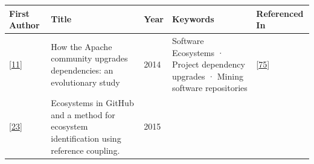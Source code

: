 \documentclass[]{book}
\begin{document}
\begin{longtable}[]{@{}lllll@{}}
\toprule
\begin{minipage}[b]{0.12\columnwidth}\raggedright\strut
First Author\strut
\end{minipage} & \begin{minipage}[b]{0.31\columnwidth}\raggedright\strut
Title\strut
\end{minipage} & \begin{minipage}[b]{0.02\columnwidth}\raggedright\strut
Year\strut
\end{minipage} & \begin{minipage}[b]{0.24\columnwidth}\raggedright\strut
Keywords\strut
\end{minipage} & \begin{minipage}[b]{0.16\columnwidth}\raggedright\strut
Referenced In\strut
\end{minipage}\tabularnewline
\midrule
\endhead
\begin{minipage}[t]{0.12\columnwidth}\raggedright\strut
{[}\protect\hyperlink{ref-Bavota2014}{11}{]}\strut
\end{minipage} & \begin{minipage}[t]{0.31\columnwidth}\raggedright\strut
How the Apache community upgrades dependencies: an evolutionary
study\strut
\end{minipage} & \begin{minipage}[t]{0.02\columnwidth}\raggedright\strut
2014\strut
\end{minipage} & \begin{minipage}[t]{0.24\columnwidth}\raggedright\strut
Software Ecosystems · Project dependency upgrades · Mining software
repositories\strut
\end{minipage} & \begin{minipage}[t]{0.16\columnwidth}\raggedright\strut
{[}\protect\hyperlink{ref-Kula2017}{75}{]}\strut
\end{minipage}\tabularnewline
\begin{minipage}[t]{0.12\columnwidth}\raggedright\strut
{[}\protect\hyperlink{ref-Blincoe2015}{23}{]}\strut
\end{minipage} & \begin{minipage}[t]{0.31\columnwidth}\raggedright\strut
Ecosystems in GitHub and a method for ecosystem identification using
reference coupling.\strut
\end{minipage} & \begin{minipage}[t]{0.02\columnwidth}\raggedright\strut
2015\strut
\end{minipage} & \begin{minipage}[t]{0.24\columnwidth}\raggedright\strut

\end{minipage}
\end{longtable}
\end{document}
